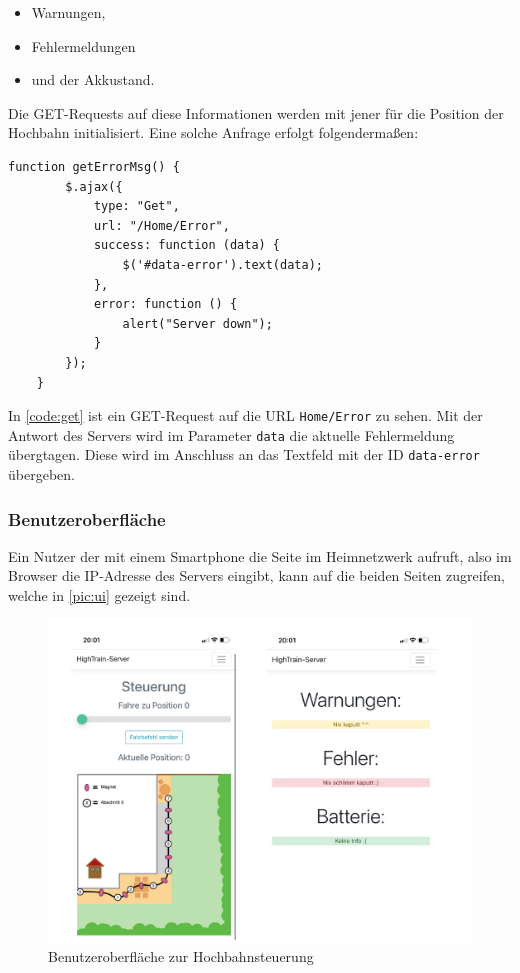 \begin{center}
	\begin{itemize}
		\item Warnungen,
		\item Fehlermeldungen
		\item und der Akkustand.
	\end{itemize}
\end{center}

Die GET-Requests auf diese Informationen werden mit jener für die Position der Hochbahn initialisiert. Eine solche Anfrage erfolgt folgendermaßen:

\begin{lstlisting}[language=html, style=dhpaperdefault]
	function getErrorMsg() {
		$.ajax({
			type: "Get",
			url: "/Home/Error",
			success: function (data) {
				$('#data-error').text(data);
			},
			error: function () {
				alert("Server down");
			}
		});
    }
\end{lstlisting}
\vspace{1cm}
In \autoref{code:get} ist ein GET-Request auf die URL \texttt{Home/Error} zu sehen. Mit der Antwort des Servers wird im Parameter \texttt{data} die aktuelle Fehlermeldung übergtagen. Diese wird im Anschluss an das Textfeld mit der ID \texttt{data-error} übergeben. 
\newpage
\subsubsection{Benutzeroberfläche}
Ein Nutzer der mit einem Smartphone die Seite im Heimnetzwerk aufruft, also im Browser die IP-Adresse des Servers eingibt, kann auf die beiden Seiten zugreifen, welche in \autoref{pic:ui} gezeigt sind.

\begin{figure}[h]
	\begin{center}
		\includegraphics[width=\textwidth]{UI.pdf}
		\caption{\label{pic:ui}Benutzeroberfläche zur Hochbahnsteuerung}
	\end{center}
\end{figure}

